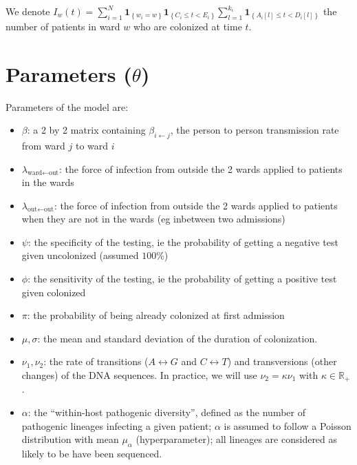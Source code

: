 \documentclass[10pt]{article}
\begin{document}
\noindent We denote $I_w\left(t\right)=\sum_{i=1}^{N} \mathbf{1}_{\left\lbrace w_i=w \right\rbrace} \mathbf{1}_{\left\lbrace C_i \leq t < E_i \right\rbrace} \sum_{l=1}^{k_i} \mathbf{1}_{\left\lbrace A_i[l] \leq t < D_i[l] \right\rbrace} $  the number of patients in ward $w$ who are colonized at time $t$.

\section*{Parameters ($\theta$)}

Parameters of the model are: 
\begin{itemize}
	\item $\beta$: a 2 by 2 matrix containing $\beta_{i \leftarrow j}$, the person to person transmission rate from ward $j$ to ward $i$
	\item $\lambda_{\text{ward} \leftarrow \text{out}}$: the force of infection from outside the 2 wards applied to patients in the wards
	\item $\lambda_{\text{out} \leftarrow \text{out}}$: the force of infection from outside the 2 wards applied to patients when they are not in the wards (eg inbetween two admissions)
	\item $\psi$: the specificity of the testing, ie the probability of getting a negative test given uncolonized (assumed $100\%$)
	\item $\phi$: the sensitivity of the testing, ie the probability of getting a positive test given colonized
	\item $\pi$: the probability of being already colonized at first admission
	\item $\mu,\sigma$: the mean and standard deviation of the duration of colonization.
	\item $\nu_1,\nu_2$: the rate of transitions ($A \leftrightarrow G$ and $C \leftrightarrow T$) and transversions (other changes) of the DNA sequences. In practice, we will use $\nu_2=\kappa\nu_1$ with $\kappa \in \mathbb{R}_+$.
	\item $\alpha$: the ``within-host pathogenic diversity'', defined as the number of pathogenic lineages infecting a given patient; $\alpha$ is assumed to follow a Poisson distribution with mean $\mu_{\alpha}$ (hyperparameter); all lineages are considered as likely to be have been sequenced.
\end{itemize}
\end{document}
